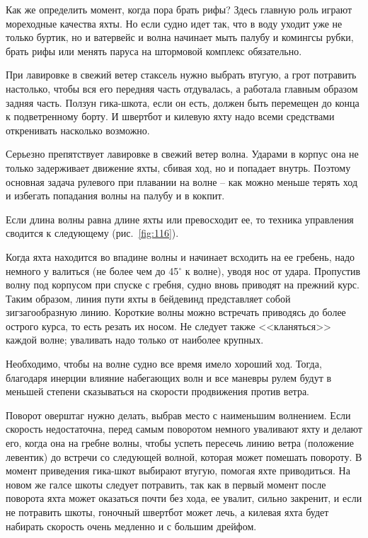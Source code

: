 \documentclass[a4paper, 12pt, twoside, final]{scrbook}
\begin{document}
Как же определить момент, когда пора брать рифы? Здесь главную роль играют мореходные качества яхты. Но если судно идет так, что в воду уходит уже не только буртик, но и ватервейс и волна начинает мыть палубу и комингсы рубки, брать рифы или менять паруса на штормовой комплекс обязательно.

При лавировке в свежий ветер стаксель нужно выбрать втугую, а грот потравить настолько, чтобы вся его передняя часть отдувалась, а работала главным образом задняя часть. Ползун гика-шкота, если он есть, должен быть перемещен до конца к подветренному борту. И швертбот и килевую яхту надо всеми средствами откренивать насколько возможно.

Серьезно препятствует лавировке в свежий ветер волна. Ударами в корпус она не только задерживает движение яхты, сбивая ход, но и попадает внутрь. Поэтому основная задача рулевого при плавании на волне \--- как можно меньше терять ход и избегать попадания волны на палубу и в кокпит.

Если длина волны равна длине яхты или превосходит ее, то техника управления сводится к следующему (рис.~\ref{fig:116}).

Когда яхта находится во впадине волны и начинает всходить на ее гребень, надо немного у валиться (не более чем до 45$^\circ$ к волне), уводя нос от удара. Пропустив волну под корпусом при спуске с гребня, судно вновь приводят на прежний курс. Таким образом, линия пути яхты в бейдевинд представляет собой зигзагообразную линию. Короткие волны можно встречать приводясь до более острого курса, то есть резать их носом. Не следует также <<кланяться>> каждой волне; уваливать надо только от наиболее крупных.

Необходимо, чтобы на волне судно все время имело хороший ход. Тогда, благодаря инерции влияние набегающих волн и все маневры рулем будут в меньшей степени сказываться на скорости продвижения против ветра.

Поворот оверштаг нужно делать, выбрав место с наименьшим волнением. Если скорость недостаточна, перед самым поворотом немного уваливают яхту и делают его, когда она на гребне волны, чтобы успеть пересечь линию ветра (положение левентик) до встречи со следующей волной, которая может помешать повороту. В момент приведения гика-шкот выбирают втугую, помогая яхте приводиться. На новом же галсе шкоты следует потравить, так как в первый момент после поворота яхта может оказаться почти без хода, ее увалит, сильно закренит, и если не потравить шкоты, гоночный швертбот может лечь, а килевая яхта будет набирать скорость очень медленно и с большим дрейфом.
\end{document}
